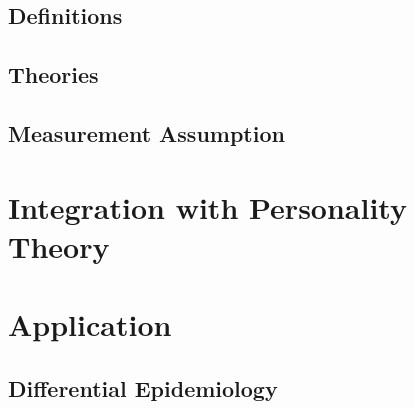 \documentclass[xcolor=x11names,compress]{beamer}\usepackage[]{graphicx}\usepackage[]{color}
\renewcommand{\(}{\begin{columns}}
\renewcommand{\)}{\end{columns}}
\newcommand{\<}[1]{\begin{column}{#1}}
\renewcommand{\>}{\end{column}}
\begin{document}






\subsection{Definitions}


\subsection{Theories}



\subsection{Measurement Assumption}
%


\section{Integration with Personality Theory}
%

\section{Application}
\subsection{Differential Epidemiology}
%


\end{document}
